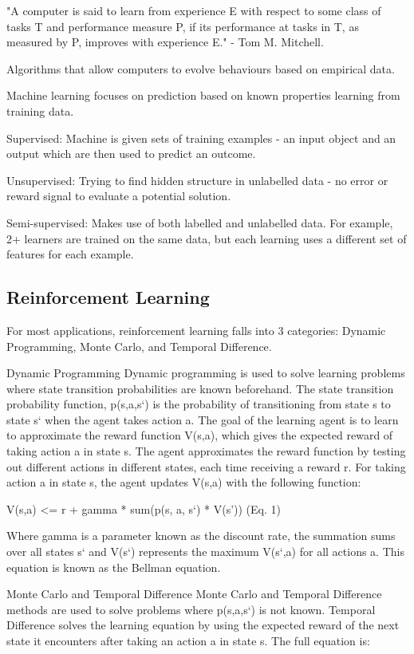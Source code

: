 \documentclass[a4paper,oneside]{report}
\begin{document}
"A computer is said to learn from experience E with respect to some class of tasks T and performance measure P, if its performance at tasks in T, as measured by P, improves with experience E." - Tom M. Mitchell.

Algorithms that allow computers to evolve behaviours based on empirical data.

Machine learning focuses on prediction based on known properties learning from training data.

Supervised: Machine is given sets of training examples - an input object and an output which are then used to predict an outcome.

Unsupervised: Trying to find hidden structure in unlabelled data - no error or reward signal to evaluate a potential solution.

Semi-supervised: Makes use of both labelled and unlabelled data. For example, 2+ learners are trained on the same data, but each learning uses a different set of features for each example. 

\subsection{Reinforcement Learning}

For most applications, reinforcement learning falls into 3 categories: Dynamic Programming, Monte Carlo, and Temporal Difference.

Dynamic Programming
Dynamic programming is used to solve learning problems where state transition probabilities are known beforehand. The state transition probability function, p(s,a,s`) is the probability of transitioning from state s to state s` when the agent takes action a. The goal of the learning agent is to learn to approximate the reward function V(s,a), which gives the expected reward of taking action a in state s. The agent approximates the reward function by testing out different actions in different states, each time receiving a reward r. For taking action a in state s, the agent updates V(s,a) with the following function:

V(s,a) <= r + gamma * sum(p(s, a, s`) * V(s')) (Eq. 1)

Where gamma is a parameter known as the discount rate, the summation sums over all states s` and V(s`) represents the maximum V(s`,a) for all actions a. This equation is known as the Bellman equation.

Monte Carlo and Temporal Difference
Monte Carlo and Temporal Difference methods are used to solve problems where p(s,a,s`) is not known. Temporal Difference solves the learning equation by using the expected reward of the next state it encounters after taking an action a in state s. The full equation is:
\end{document}
